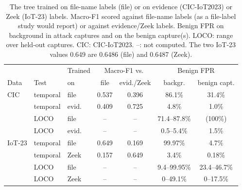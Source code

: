 \begin{table}[t]
\centering
\caption{The tree trained on file-name labels (file) or on evidence (CIC-IoT2023) or Zeek (IoT-23) labels. Macro-F1 scored against file-name labels (as a file-label study would report) or against evidence/Zeek labels. Benign FPR on background in attack captures and on the benign capture(s). LOCO: range over held-out captures. CIC: CIC-IoT2023. --: not computed. The two IoT-23 values 0.649 are 0.6486 (file) and 0.6487 (Zeek).}
\label{tab:filelabel}
\footnotesize
\setlength{\tabcolsep}{2.6pt}
\begin{tabular}{lllcccc}
\hline
 & & Trained & \multicolumn{2}{c}{Macro-F1 vs.} & \multicolumn{2}{c}{Benign FPR} \\
Data & Test & on & file & evid./Zeek & backgr. & benign capt. \\
\hline
CIC & temporal & file  & 0.537 & 0.396 & 86.1\% & 31.4\% \\
            & temporal & evid. & 0.409 & 0.725 & 4.8\% & 1.0\% \\
            & LOCO     & file  & --    & --    & 71.4--87.8\% & (100\%) \\
            & LOCO     & evid. & --    & --    & 0.5--5.4\% & 1.5\% \\
\hline
IoT-23      & temporal & file  & 0.649 & 0.169 & 99.97\% & 4.7\% \\
            & temporal & Zeek  & 0.157 & 0.649 & 3.4\% & 0.18\% \\
            & LOCO     & file  & --    & --    & 9.4--99.95\% & 23.4--46.7\% \\
            & LOCO     & Zeek  & --    & --    & 0--49.1\% & 0--17.5\% \\
\hline
\end{tabular}
\end{table}

